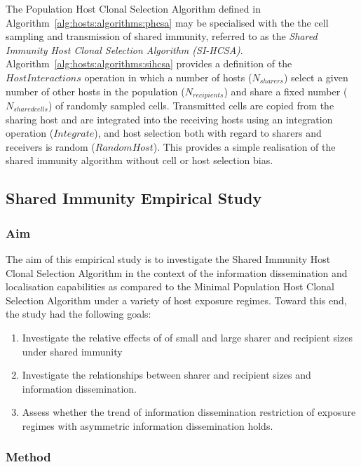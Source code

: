 The Population Host Clonal Selection Algorithm defined in Algorithm~\ref{alg:hosts:algorithms:phcsa} may be specialised with the the cell sampling and transmission of shared immunity, referred to as the \emph{Shared Immunity Host Clonal Selection Algorithm (SI-HCSA)}. Algorithm~\ref{alg:hosts:algorithms:sihcsa} provides a definition of the $HostInteractions$ operation in which a number of hosts ($N_{sharers}$) select a given number of other hosts in the population ($N_{recipients}$) and share a fixed number ($N_{sharedcells}$) of randomly sampled cells. Transmitted cells are copied from the sharing host and are integrated into the receiving hosts using an integration operation ($Integrate$), and host selection both with regard to sharers and receivers is random ($RandomHost$). This provides a simple realisation of the shared immunity algorithm without cell or host selection bias. 

%
%
\subsection{Shared Immunity Empirical Study}
\label{sec:hosts:population:shared:study}

%
%
\subsubsection{Aim}
The aim of this empirical study is to investigate the Shared Immunity Host Clonal Selection Algorithm in the context of the information dissemination and localisation capabilities as compared to the Minimal Population Host Clonal Selection Algorithm under a variety of host exposure regimes. Toward this end, the study had the following goals:

\begin{enumerate}
	\item Investigate the relative effects of of small and large sharer and recipient sizes under shared immunity
	\item Investigate the relationships between sharer and recipient sizes and information dissemination.
	\item Assess whether the trend of information dissemination restriction of exposure regimes with asymmetric information dissemination holds.
\end{enumerate}

%
%
\subsubsection{Method}

